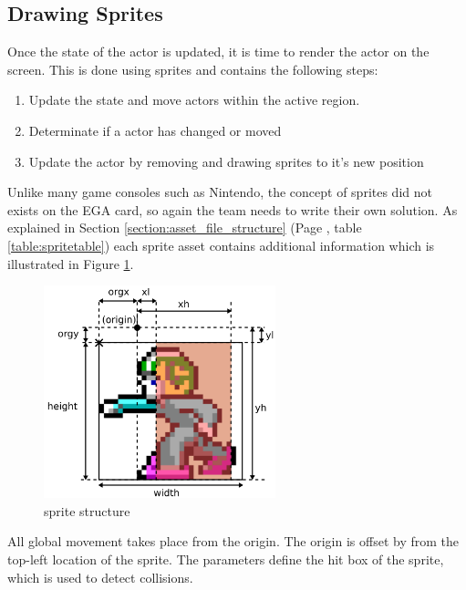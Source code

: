 \documentclass[book.tex]{subfiles}
\begin{document}
\subsection{Drawing Sprites}
\label{section:draw_sprites}
Once the state of the actor is updated, it is time to render the actor on the screen. This is done using sprites and contains the following steps:
\begin{enumerate}
\item Update the state and move actors within the active region.
\item Determinate if a actor has changed or moved
\item Update the actor by removing and drawing sprites to it's new position
\end{enumerate}

Unlike many game consoles such as Nintendo, the concept of sprites did not exists on the EGA card, so again the team needs to write their own solution. As explained in Section \ref{section:asset_file_structure} (Page \pageref{table:spritetable}, table \ref{table:spritetable}) each sprite asset contains additional information which is illustrated in Figure \ref{fig:sprite_structure}.\\
\begin{figure}[H]
  \centering
  \includegraphics[width=0.6\textwidth]{imgs/drawings/sprite.png}
  \caption{sprite structure}
  \label{fig:sprite_structure}
\end{figure}

All global movement takes place from the origin. The origin is offset by  from the top-left location of the sprite. The parameters  define the hit box of the sprite, which is used to detect collisions.\\
\end{document}
